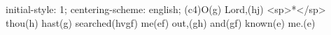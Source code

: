 initial-style: 1;
centering-scheme: english;
(c4)O(g) Lord,(hj) <sp>*</sp> thou(h) hast(g) searched(hvgf) me(ef) out,(gh) and(gf) known(e) me.(e)
